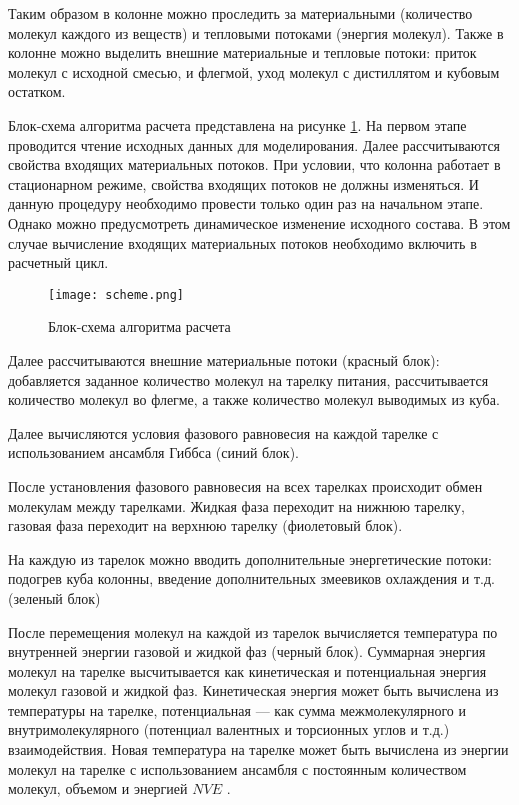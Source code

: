 Таким образом в колонне можно проследить за материальными (количество молекул каждого из веществ) и тепловыми потоками (энергия молекул). Также в колонне можно выделить внешние материальные и тепловые потоки: приток молекул с исходной смесью, и флегмой, уход молекул с дистиллятом и кубовым остатком.

Блок-схема алгоритма расчета представлена на рисунке \ref{fig:alg_scheme}. На первом этапе проводится чтение исходных данных для моделирования. Далее рассчитываются свойства входящих материальных потоков. При условии, что колонна работает в стационарном режиме, свойства входящих потоков не должны изменяться. И данную процедуру необходимо провести только один раз на начальном этапе. Однако можно предусмотреть динамическое изменение исходного состава. В этом случае вычисление входящих материальных потоков необходимо включить в расчетный цикл.

\begin{figure}
	\begin{center}
		\texttt{[image: scheme.png]}
	\end{center}
	\caption{Блок-схема алгоритма расчета} \label{fig:alg_scheme}
\end{figure}

Далее рассчитываются внешние материальные потоки (красный блок): добавляется заданное количество молекул на тарелку питания, рассчитывается количество молекул во флегме, а также количество молекул выводимых из куба.

Далее вычисляются условия фазового равновесия на каждой тарелке с использованием ансамбля Гиббса (синий блок).

После установления фазового равновесия на всех тарелках происходит обмен молекулам между тарелками. Жидкая фаза переходит на нижнюю тарелку, газовая фаза переходит на верхнюю тарелку (фиолетовый блок).

На каждую из тарелок можно вводить дополнительные энергетические потоки: подогрев куба колонны, введение дополнительных змеевиков охлаждения и т.д. (зеленый блок)

После перемещения молекул на каждой из тарелок вычисляется температура по внутренней энергии газовой и жидкой фаз (черный блок). Суммарная энергия молекул на тарелке высчитывается как кинетическая и потенциальная энергия молекул газовой и жидкой фаз. Кинетическая энергия может быть вычислена из температуры на тарелке, потенциальная --- как сумма межмолекулярного и внутримолекулярного (потенциал валентных и торсионных углов и т.д.) взаимодействия.
Новая температура на тарелке может быть вычислена из энергии молекул на тарелке с использованием ансамбля с постоянным количеством молекул, объемом и энергией $NVE$ \cite{Lustig1998}.

